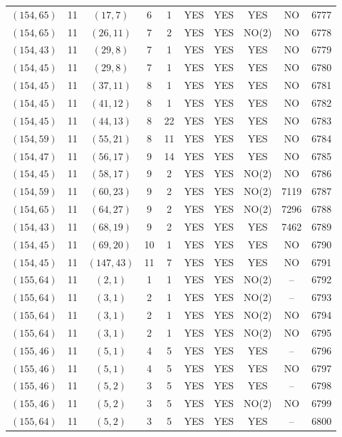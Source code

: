 \begin{longtable}{|c|c|c|c|c|c|c|c|c|c|}
$(154, 65)$ & 11 & $(17, 7)$ & 6 & 1 & YES & YES & YES & NO & 6777\\
$(154, 65)$ & 11 & $(26, 11)$ & 7 & 2 & YES & YES & NO(2) & NO & 6778\\
$(154, 43)$ & 11 & $(29, 8)$ & 7 & 1 & YES & YES & YES & NO & 6779\\
$(154, 45)$ & 11 & $(29, 8)$ & 7 & 1 & YES & YES & YES & NO & 6780\\
$(154, 45)$ & 11 & $(37, 11)$ & 8 & 1 & YES & YES & YES & NO & 6781\\
$(154, 45)$ & 11 & $(41, 12)$ & 8 & 1 & YES & YES & YES & NO & 6782\\
$(154, 45)$ & 11 & $(44, 13)$ & 8 & 22 & YES & YES & YES & NO & 6783\\
$(154, 59)$ & 11 & $(55, 21)$ & 8 & 11 & YES & YES & YES & NO & 6784\\
$(154, 47)$ & 11 & $(56, 17)$ & 9 & 14 & YES & YES & YES & NO & 6785\\
$(154, 45)$ & 11 & $(58, 17)$ & 9 & 2 & YES & YES & NO(2) & NO & 6786\\
$(154, 59)$ & 11 & $(60, 23)$ & 9 & 2 & YES & YES & NO(2) & 7119 & 6787\\
$(154, 65)$ & 11 & $(64, 27)$ & 9 & 2 & YES & YES & NO(2) & 7296 & 6788\\
$(154, 43)$ & 11 & $(68, 19)$ & 9 & 2 & YES & YES & YES & 7462 & 6789\\
$(154, 45)$ & 11 & $(69, 20)$ & 10 & 1 & YES & YES & YES & NO & 6790\\
$(154, 45)$ & 11 & $(147, 43)$ & 11 & 7 & YES & YES & YES & NO & 6791\\
$(155, 64)$ & 11 & $(2, 1)$ & 1 & 1 & YES & YES & NO(2) & -- & 6792\\
$(155, 64)$ & 11 & $(3, 1)$ & 2 & 1 & YES & YES & NO(2) & -- & 6793\\
$(155, 64)$ & 11 & $(3, 1)$ & 2 & 1 & YES & YES & NO(2) & NO & 6794\\
$(155, 64)$ & 11 & $(3, 1)$ & 2 & 1 & YES & YES & NO(2) & NO & 6795\\
$(155, 46)$ & 11 & $(5, 1)$ & 4 & 5 & YES & YES & YES & -- & 6796\\
$(155, 46)$ & 11 & $(5, 1)$ & 4 & 5 & YES & YES & YES & NO & 6797\\
$(155, 46)$ & 11 & $(5, 2)$ & 3 & 5 & YES & YES & YES & -- & 6798\\
$(155, 46)$ & 11 & $(5, 2)$ & 3 & 5 & YES & YES & NO(2) & NO & 6799\\
$(155, 64)$ & 11 & $(5, 2)$ & 3 & 5 & YES & YES & YES & -- & 6800\\

\end{longtable}

